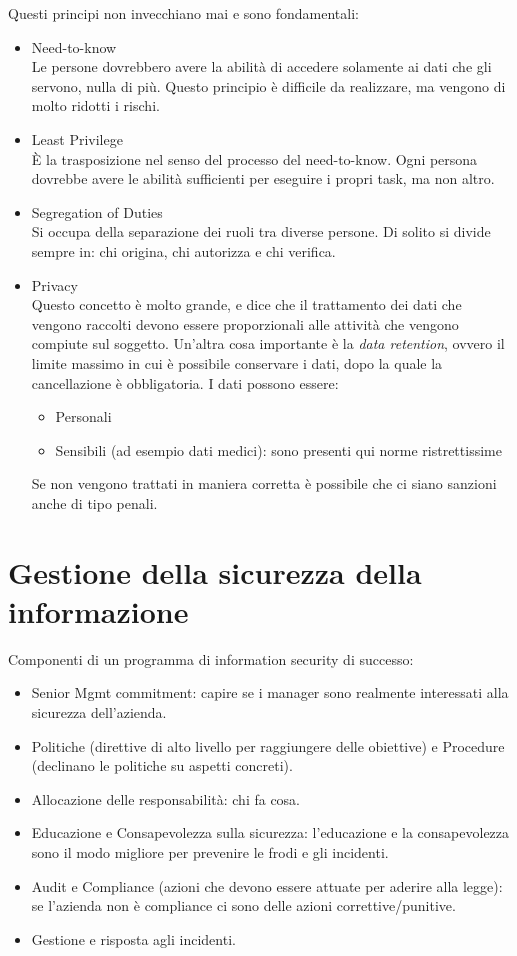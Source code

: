 Questi principi non invecchiano mai e sono fondamentali:
\begin{itemize}
  \item Need-to-know \\
  Le persone dovrebbero avere la abilità di accedere solamente ai dati che gli 
  servono, nulla di più. Questo principio è difficile da realizzare, ma vengono 
  di molto ridotti i rischi.
  \item Least Privilege \\
  È la trasposizione nel senso del processo del need-to-know. Ogni persona 
  dovrebbe avere le abilità sufficienti per eseguire i propri task, ma non 
  altro.
  \item Segregation of Duties \\
  Si occupa della separazione dei ruoli tra diverse persone. Di solito si 
  divide sempre in: chi origina, chi autorizza e chi verifica.
  \item Privacy \\
  Questo concetto è molto grande, e dice che il trattamento dei dati che 
  vengono raccolti devono essere proporzionali alle attività che vengono 
  compiute sul soggetto. Un'altra cosa importante è la \textit{data retention}, 
  ovvero il limite massimo in cui è possibile conservare i dati, dopo la quale 
  la cancellazione è obbligatoria. I dati possono essere:
  \begin{itemize}
    \item Personali
    \item Sensibili (ad esempio dati medici): sono presenti qui norme 
    ristrettissime
  \end{itemize}
  Se non vengono trattati in maniera corretta è possibile che ci siano sanzioni 
  anche di tipo penali.
\end{itemize}

\section{Gestione della sicurezza della informazione}

Componenti di un programma di information security di successo:

\begin{itemize}
\item  Senior Mgmt commitment: capire se i manager sono realmente interessati alla sicurezza dell'azienda.
\item Politiche (direttive di alto livello per raggiungere delle obiettive) e Procedure (declinano le politiche su aspetti concreti).
\item Allocazione delle responsabilità: chi fa cosa.
\item Educazione e Consapevolezza sulla sicurezza: l'educazione e la consapevolezza sono il modo migliore per prevenire le frodi e gli incidenti.
\item Audit e Compliance (azioni che devono essere attuate per aderire alla legge): se l'azienda non è compliance ci sono delle azioni correttive/punitive.
\item Gestione e risposta agli incidenti.
\end{itemize}

